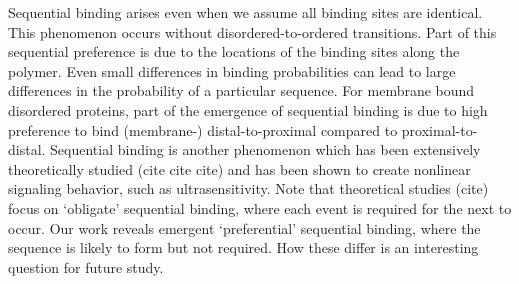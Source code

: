 \documentclass[../../AdvancementSummary.tex]{subfiles}
\begin{document}
Sequential binding arises even when we assume all binding sites are identical. This phenomenon occurs without disordered-to-ordered transitions. 
	Part of this sequential preference is due to the locations of the binding sites along the polymer. Even small differences in binding probabilities can lead to large differences in the probability of a particular sequence.
	For membrane bound disordered proteins, part of the emergence of sequential binding is due to high preference to bind (membrane-) distal-to-proximal compared to proximal-to-distal.
	Sequential binding is another phenomenon which has been extensively theoretically studied (cite cite cite) and has been shown to create nonlinear signaling behavior, such as ultrasensitivity.	
	Note that theoretical studies (cite) focus on `obligate' sequential binding, where each event is required for the next to occur. Our work reveals emergent `preferential' sequential binding, where the sequence is likely to form but not required. How these differ is an interesting question for future study. 
		

%
%
%



\end{document}
